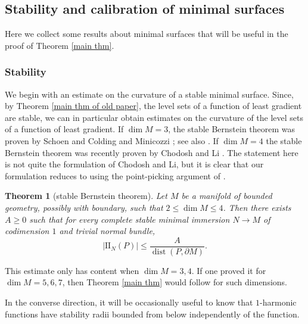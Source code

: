 \documentclass[reqno,11pt]{amsart}
\DeclareMathOperator{\dist}{dist}
\newcommand{\Two}{\mathrm{I\!I}}
\newtheorem{theorem}{Theorem}[section]
\theoremstyle{definition}
\numberwithin{equation}{section}
\begin{document}
\subsection{Stability and calibration of minimal surfaces}
Here we collect some results about minimal surfaces that will be useful in the proof of Theorem \ref{main thm}.

\subsubsection{Stability}
We begin with an estimate on the curvature of a stable minimal surface.
Since, by Theorem \ref{main thm of old paper}, the level sets of a function of least gradient are stable, we can in particular obtain estimates on the curvature of the level sets of a function of least gradient.
If $\dim M = 3$, the stable Bernstein theorem was proven by Schoen \cite{Schoen2016} and Colding and Minicozzi \cite{ColdingMinicozziParametric}; see also \cite[Theorem 2.10]{colding2011course}.
If $\dim M = 4$ the stable Bernstein theorem was recently proven by Chodosh and Li \cite{Chodosh2021}.
The statement here is not quite the formulation of Chodosh and Li, but it is clear that our formulation reduces to \cite[Theorem 1]{Chodosh2021} using the point-picking argument of \cite[\S5]{Chodosh2021}.

\begin{theorem}[stable Bernstein theorem]\label{stable Bernstein}
	Let $M$ be a manifold of bounded geometry, possibly with boundary, such that $2 \leq \dim M \leq 4$.
	Then there exists $A \geq 0$ such that for every complete stable minimal immersion $N \to M$ of codimension $1$ and trivial normal bundle,
	$$|\Two_N(P)| \leq \frac{A}{\dist(P, \partial M)}.$$
\end{theorem}

This estimate only has content when $\dim M = 3, 4$.
If one proved it for $\dim M = 5, 6, 7$, then Theorem \ref{main thm} would follow for such dimensions.

In the converse direction, it will be occasionally useful to know that $1$-harmonic functions have stability radii bounded from below independently of the function.
\end{document}
